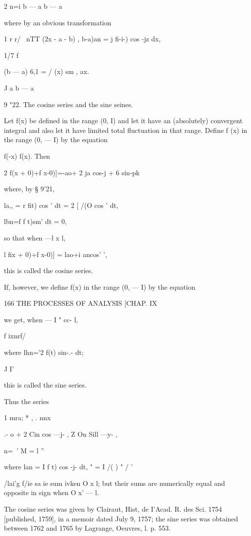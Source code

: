 2 n=i b — a b — a

where by an obvious transformation

1 r r/ \ nTT (2x - a - b) , b-a)an = j fi-i-) cos -jz dx,

1/7 \; f%

  (b — a) 6,1 = / (x) sm , ax.

  J a b — a

9 "22. The cosine series and the sine seines.

Let f(x) be defined in the range (0, I) and let it have an
(absolutely) convergent integral and also let it have limited total
fluctuation in that range. Define f (x) in the range (0, — I) by the
equation

f(-x) f(x). Then

2 f(x + 0)+f x-0)]=-ao+ 2 ja cos-j + 6 sin-pk

where, by § 9'21,

la,, = r fit) cos ' dt = 2 [ /(O cos ' dt,

lbn=f f t)sm' dt = 0,

so that when —l x l,

l fix + 0)+f x-0)] = lao+i ancos' ',

this is called the cosine series.

If, however, we define f(x) in the range (0, — I) by the equation



166 THE PROCESSES OF ANALYSIS [CHAP. IX

we get, when — I " cc- l,

f ixnrf/

where lhn='2 f(t) sin-.- dt;

J I'

this is called the sine series.

Thus the series

1 mra; * , . nnx

.- o + 2 Cin cos —j- , Z On Sill —y- ,

  n=\ ' M = l ''

where lan = I f t) cos -j- dt, " = I /( ) " / '

/lai'g f/ie sa ie sum ivken O x l; but their sums are numerically
equal and opposite in sign when O x' — l.

The cosine series was given by Clairaut, Hist, de I'Acad. R. des Sci.
1754 [published, 1759], in a memoir dated July 9, 1757; the sine
series was obtained between 1762 and 1765 by Lagrange, Oeuvres, l. p.
553.

